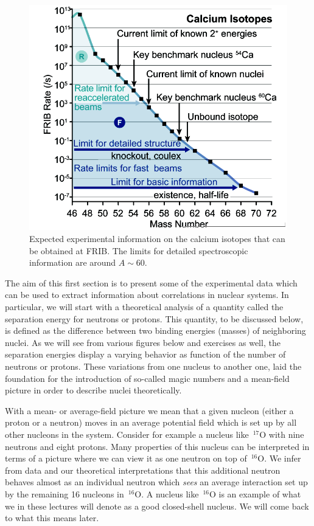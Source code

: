 \documentclass[%
twoside,                 %
final,                   %
10pt]{article}
\begin{document}
\begin{figure}[t]
  \centerline{\includegraphics[width=0.6\linewidth]{fig-intro/careach.png}}
  \caption{
  Expected experimental information on the calcium isotopes that can be obtained at FRIB. The limits for detailed spectroscopic information are around $A\sim 60$.
  }
\end{figure}



The aim of this first section is to present some of the experimental data which can be used to extract 
information about correlations in nuclear systems. In particular, we will start with a theoretical analysis of a quantity called the separation energy for neutrons or protons. This quantity, to be discussed below, is defined as the difference between two binding energies (masses) of neighboring nuclei. As we will see from various figures below and exercises as well, the separation energies display a varying behavior as function of the number of neutrons or protons. These variations from one nucleus to another one, laid the foundation for the introduction of so-called magic numbers and a mean-field picture in order to describe nuclei theoretically.



With a mean- or average-field picture we mean that a given nucleon (either a proton or a neutron) moves in an average potential field which is set up by all other nucleons in the system. Consider for example a nucleus like $\,{}^{17}\mbox{O}$ with nine neutrons and eight protons. Many properties  of this nucleus can be interpreted in terms of a picture where we can view it as
one neutron on top of $\,{}^{16}\mbox{O}$. We infer from data and our theoretical interpretations that this additional neutron behaves almost as an individual neutron which \emph{sees} an average interaction set up by the remaining 16 nucleons in   $\,{}^{16}\mbox{O}$. A nucleus like $\,{}^{16}\mbox{O}$ is an example of what we in these lectures will denote as a good closed-shell nucleus. We will come back to what this means later.
\end{document}

